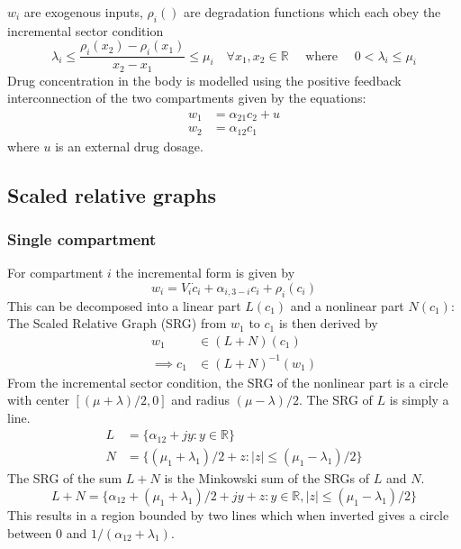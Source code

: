 \documentclass{article}
\begin{document}
$w_i$ are exogenous inputs, $\rho_i()$ are degradation functions which each obey the incremental sector condition
\begin{equation}
    \lambda_i \leq \frac{\rho_i(x_2) - \rho_i(x_1)}{x_2 - x_1} \leq \mu_i \quad \forall x_1, x_2 \in \mathbb{R} \quad \text{ where } \quad 0 < \lambda_i \leq \mu_i
\end{equation}
Drug concentration in the body is modelled using the positive feedback interconnection of the two compartments given by the equations:
\begin{align}
    w_1 &= \alpha_{21} c_2 + u \\
    w_2 &= \alpha_{12} c_1
\end{align}
where $u$ is an external drug dosage.
\subsection{Scaled relative graphs}

\subsubsection{Single compartment}

For compartment $i$ the incremental form is given by
\begin{equation}
    w_i = V_i \dot{c}_i + \alpha_{i,3-i} c_i + \rho_i(c_i)
\end{equation}
This can be decomposed into a linear part $L(c_1)$ and a nonlinear part $N(c_1)$:
The Scaled Relative Graph (SRG) from $w_1$ to $c_1$ is then derived by
\begin{align}
    w_1 &\in (L + N)(c_1) \\
    \implies c_1 &\in (L + N)^{-1}(w_1) 
\end{align}
From the incremental sector condition, the SRG of the nonlinear part is a circle with center $[(\mu+\lambda)/2, 0]$ and radius $(\mu-\lambda)/2$.
The SRG of $L$ is simply a line.
\begin{align}
    L &= \{ \alpha_{12} + j y : y \in \mathbb{R} \} \\
    N &= \{ (\mu_1 + \lambda_1)/2 + z : |z| \leq (\mu_1 - \lambda_1)/2 \}
\end{align}
The SRG of the sum $L + N$ is the Minkowski sum of the SRGs of $L$ and $N$.
\begin{equation}
    L + N = \{ \alpha_{12} + (\mu_1 + \lambda_1)/2 + jy + z : y \in \mathbb{R}, |z| \leq (\mu_1 - \lambda_1)/2 \}
\end{equation}
This results in a region bounded by two lines which when inverted gives a circle between 0 and $1/(\alpha_{12} + \lambda_1)$.
\end{document}
